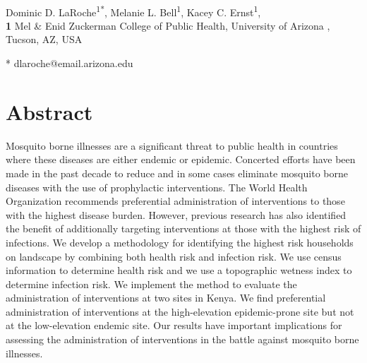 \documentclass[10pt,letterpaper]{article}\usepackage[]{graphicx}\usepackage[]{color}
\date{}
\begin{document}
\vspace*{0.2in}
\begin{flushleft}
{\Large
\textbf{} %
}
\newline
\\
Dominic D. LaRoche\textsuperscript{1*},
Melanie L. Bell\textsuperscript{1},
Kacey C. Ernst\textsuperscript{1},
\\
\bigskip
\textbf{1} Mel & Enid Zuckerman College of Public Health, University of Arizona , Tucson, AZ, USA
\\
\bigskip

* dlaroche@email.arizona.edu

\end{flushleft}






\section*{Abstract}
Mosquito borne illnesses are a significant threat to public health in countries where these diseases are either endemic or epidemic. Concerted efforts have been made in the past decade to reduce and in some cases eliminate mosquito borne diseases with the use of prophylactic interventions. The World Health Organization recommends preferential administration of interventions to those with the highest disease burden. However,  previous research has also identified the benefit of additionally targeting interventions at those with the highest risk of infections. We develop a methodology for identifying the highest risk households on landscape by combining both health risk and infection risk.  We use census information to determine health risk and we use a topographic wetness index to determine infection risk.  We implement the method to evaluate the administration of interventions at two sites in Kenya. We find preferential administration of interventions at the high-elevation epidemic-prone site but not at the low-elevation endemic site. Our results have important implications for assessing the administration of interventions in the battle against mosquito borne illnesses.
\end{document}

